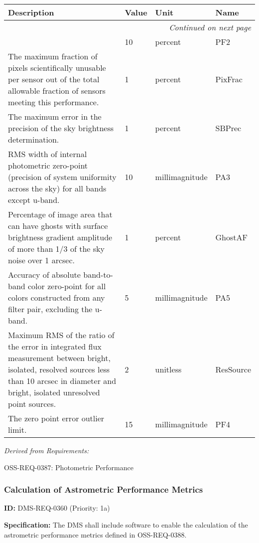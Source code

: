\documentclass[SE,toc,lsstdraft]{lsstdoc}
\makeatletter
\newcommand{\paramname}[1]{\hspace{0pt}#1}
\newcommand{\unitname}[1]{\hspace{0pt}#1}
\newenvironment{parameters}[0]{%
\setlength\LTleft{0pt}
\setlength\LTright{\fill}
\begin{small}
\begin{longtable}[]{|p{0.49\textwidth}|l|p{0.6in}|p{1.70in}@{}|}

\hline \textbf{Description} & \textbf{Value} & \textbf{Unit} & \textbf{Name} \\ \hline
\endhead

\hline \multicolumn{4}{r}{\emph{Continued on next page}} \\
\endfoot

\hline\hline
\endlastfoot
}{%
\hline
\end{longtable}
\end{small}
}
\makeatother
\begin{document}
\begin{parameters}
&
10
&
\unitname{%
percent
}
&
\paramname{%
PF2
} \\\hline
The maximum fraction of pixels scientifically unusable per sensor out of the total allowable fraction of sensors meeting this performance.
&
1
&
\unitname{%
percent
}
&
\paramname{%
PixFrac
} \\\hline
The maximum error in the precision of the sky brightness determination.

&
1
&
\unitname{%
percent
}
&
\paramname{%
SBPrec
} \\\hline
RMS width of internal photometric zero-point (precision of system uniformity across the sky) for all bands except u-band.

&
10
&
\unitname{%
millimagnitude
}
&
\paramname{%
PA3
} \\\hline
Percentage of image area that can have ghosts with surface brightness gradient amplitude of more than 1/3 of the sky noise over 1 arcsec.

&
1
&
\unitname{%
percent
}
&
\paramname{%
GhostAF
} \\\hline
Accuracy of absolute band-to-band color zero-point for all colors constructed from any filter pair, excluding the u-band.
&
5
&
\unitname{%
millimagnitude
}
&
\paramname{%
PA5
} \\\hline
Maximum RMS of the ratio of the error in integrated flux measurement between bright, isolated, resolved sources less than 10 arcsec in diameter and bright, isolated unresolved point sources.
&
2
&
\unitname{%
unitless
}
&
\paramname{%
ResSource
} \\\hline
    The zero point error outlier limit.
&
15
&
\unitname{%
millimagnitude
}
&
\paramname{%
PF4
} \\\hline
\end{parameters}

\emph{Derived from Requirements:}

OSS-REQ-0387:
Photometric Performance \newline

\subsubsection{Calculation of Astrometric Performance Metrics}

\label{DMS-REQ-0360}
\textbf{ID:} DMS-REQ-0360 (Priority: 1a)

\textbf{Specification:}
The DMS shall include software to enable the calculation of the astrometric performance metrics defined in OSS-REQ-0388.
\end{document}
